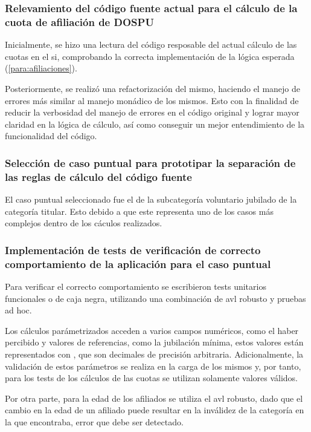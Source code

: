 \subsubsection{Relevamiento del código fuente actual para el cálculo de la cuota de afiliación de DOSPU}
Inicialmente, se hizo una lectura del código resposable del actual cálculo de las cuotas en el \acrshort{si}, comprobando la correcta implementación de la lógica esperada (\cref{para:afiliaciones}).

Posteriormente, se realizó una refactorización del mismo, haciendo el manejo de errores más similar al manejo monádico de los mismos. Esto con la finalidad de reducir la verbosidad del manejo de errores en el código original y lograr mayor claridad en la lógica de cálculo, así como conseguir un mejor entendimiento de la funcionalidad del código.

\subsubsection{Selección de caso puntual para prototipar la separación de las reglas de cálculo del código fuente}
El caso puntual seleccionado fue el de la subcategoría voluntario jubilado de la categoría titular. Esto debido a que este representa uno de los casos más complejos dentro de los cáculos realizados.

\subsubsection{Implementación de tests de verificación de correcto comportamiento de la aplicación para el caso puntual }\label{para:tests}
Para verificar el correcto comportamiento se escribieron tests unitarios funcionales o de caja negra, utilizando una combinación de \acrfull{avl} robusto y pruebas ad hoc.

Los cálculos parámetrizados acceden a varios campos numéricos, como el haber percibido y valores de referencias, como la jubilación mínima, estos valores están representados con , que son decimales de precisión arbitraria. Adicionalmente, la validación de estos parámetros se realiza en la carga de los mismos y, por tanto, para los tests de los cálculos de las cuotas se utilizan solamente valores válidos.

Por otra parte, para la edad de los afiliados se utiliza el \acrshort{avl} robusto, dado que el cambio en la edad de un afiliado puede resultar en la inválidez de la categoría en la que encontraba, error que debe ser detectado.


